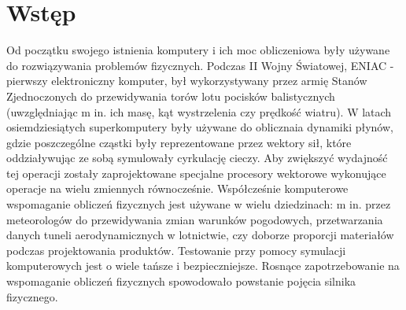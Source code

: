  \section{Wstęp}\label{sec:wstep}
Od początku swojego istnienia komputery i ich moc obliczeniowa były
używane do rozwiązywania problemów fizycznych. Podczas II Wojny Światowej, ENIAC
- pierwszy elektroniczny komputer, był wykorzystywany przez armię Stanów Zjednoczonych do
przewidywania torów lotu pocisków balistycznych (uwzględniając m in. ich masę,
kąt wystrzelenia czy prędkość wiatru). W latach osiemdziesiątych superkomputery
były używane do oblicznaia dynamiki płynów, gdzie poszczególne cząstki były
reprezentowane przez wektory sił, które oddziaływując ze sobą symulowały
cyrkulację cieczy. Aby zwiększyć wydajność tej operacji zostały zaprojektowane
specjalne procesory wektorowe wykonujące operacje na wielu zmiennych
równocześnie. Współcześnie komputerowe wspomaganie obliczeń fizycznych jest
używane w wielu dziedzinach: m in. przez meteorologów do przewidywania zmian
warunków pogodowych, przetwarzania danych tuneli aerodynamicznych w lotnictwie,
czy doborze proporcji materiałów podczas projektowania produktów. Testowanie
przy pomocy symulacji komputerowych jest o wiele tańsze i bezpieczniejsze. Rosnące
zapotrzebowanie na wspomaganie obliczeń fizycznych spowodowało powstanie pojęcia
silnika fizycznego.
